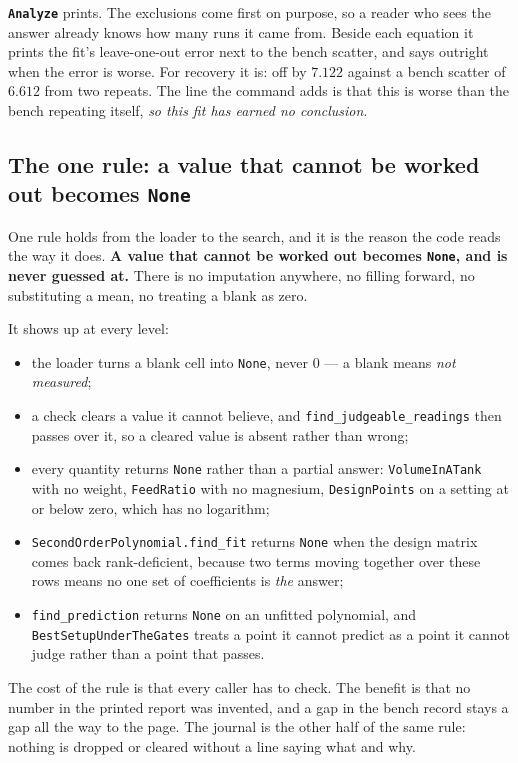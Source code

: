 \textbf{\texttt{Analyze}} prints. The exclusions come first on purpose, so a reader who sees
the answer already knows how many runs it came from. Beside each equation it prints the
fit's leave-one-out error next to the bench scatter, and says outright when the error is
worse. For recovery it is: off by $7.122$ against a bench scatter of $6.612$ from two
repeats. The line the command adds is that this is worse than the bench repeating itself,
\emph{so this fit has earned no conclusion}.

\subsection{The one rule: a value that cannot be worked out becomes \texttt{None}}

One rule holds from the loader to the search, and it is the reason the code reads the way it
does. \textbf{A value that cannot be worked out becomes \texttt{None}, and is never guessed
at.} There is no imputation anywhere, no filling forward, no substituting a mean, no
treating a blank as zero.

It shows up at every level:

\begin{itemize}[nosep]
  \item the loader turns a blank cell into \texttt{None}, never $0$ --- a blank means
        \emph{not measured};
  \item a check clears a value it cannot believe, and \texttt{find\_judgeable\_readings}
        then passes over it, so a cleared value is absent rather than wrong;
  \item every quantity returns \texttt{None} rather than a partial answer:
        \texttt{VolumeInATank} with no weight, \texttt{FeedRatio} with no magnesium,
        \texttt{DesignPoints} on a setting at or below zero, which has no logarithm;
  \item \texttt{SecondOrderPolynomial.find\_fit} returns \texttt{None} when the design
        matrix comes back rank-deficient, because two terms moving together over these rows
        means no one set of coefficients is \emph{the} answer;
  \item \texttt{find\_prediction} returns \texttt{None} on an unfitted polynomial, and
        \texttt{BestSetupUnderTheGates} treats a point it cannot predict as a point it
        cannot judge rather than a point that passes.
\end{itemize}

The cost of the rule is that every caller has to check. The benefit is that no number in the
printed report was invented, and a gap in the bench record stays a gap all the way to the
page. The journal is the other half of the same rule: nothing is dropped or cleared without
a line saying what and why.

